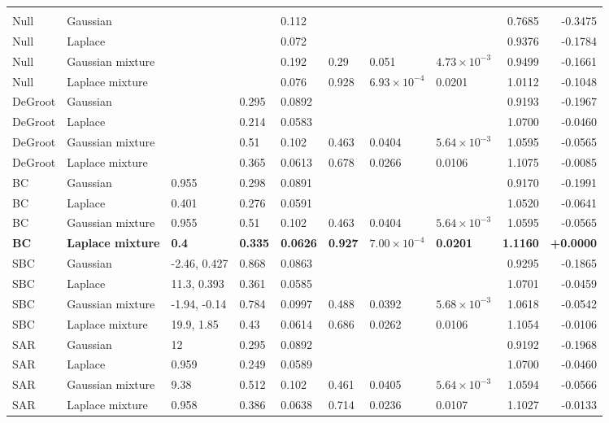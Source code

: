 \begin{longtable}{llllllllrr}
\midrule
\multicolumn{10}{l}{\vkc{}} \\
Null & Gaussian &  &  & 0.112 &  &  &  & 0.7685 & -0.3475 \\
Null & Laplace &  &  & 0.072 &  &  &  & 0.9376 & -0.1784 \\
Null & Gaussian mixture &  &  & 0.192 & 0.29 & 0.051 & $4.73\times10^{-3}$ & 0.9499 & -0.1661 \\
Null & Laplace mixture &  &  & 0.076 & 0.928 & $6.93\times10^{-4}$ & 0.0201 & 1.0112 & -0.1048 \\
DeGroot & Gaussian &  & 0.295 & 0.0892 &  &  &  & 0.9193 & -0.1967 \\
DeGroot & Laplace &  & 0.214 & 0.0583 &  &  &  & 1.0700 & -0.0460 \\
DeGroot & Gaussian mixture &  & 0.51 & 0.102 & 0.463 & 0.0404 & $5.64\times10^{-3}$ & 1.0595 & -0.0565 \\
DeGroot & Laplace mixture &  & 0.365 & 0.0613 & 0.678 & 0.0266 & 0.0106 & 1.1075 & -0.0085 \\
BC & Gaussian & 0.955 & 0.298 & 0.0891 &  &  &  & 0.9170 & -0.1991 \\
BC & Laplace & 0.401 & 0.276 & 0.0591 &  &  &  & 1.0520 & -0.0641 \\
BC & Gaussian mixture & 0.955 & 0.51 & 0.102 & 0.463 & 0.0404 & $5.64\times10^{-3}$ & 1.0595 & -0.0565 \\
\textbf{BC} & \textbf{Laplace mixture} & \textbf{0.4} & \textbf{0.335} & \textbf{0.0626} & \textbf{0.927} & \textbf{$7.00\times10^{-4}$} & \textbf{0.0201} & \textbf{1.1160} & \textbf{+0.0000} \\
SBC & Gaussian & -2.46, 0.427 & 0.868 & 0.0863 &  &  &  & 0.9295 & -0.1865 \\
SBC & Laplace & 11.3, 0.393 & 0.361 & 0.0585 &  &  &  & 1.0701 & -0.0459 \\
SBC & Gaussian mixture & -1.94, -0.14 & 0.784 & 0.0997 & 0.488 & 0.0392 & $5.68\times10^{-3}$ & 1.0618 & -0.0542 \\
SBC & Laplace mixture & 19.9, 1.85 & 0.43 & 0.0614 & 0.686 & 0.0262 & 0.0106 & 1.1054 & -0.0106 \\
SAR & Gaussian & 12 & 0.295 & 0.0892 &  &  &  & 0.9192 & -0.1968 \\
SAR & Laplace & 0.959 & 0.249 & 0.0589 &  &  &  & 1.0700 & -0.0460 \\
SAR & Gaussian mixture & 9.38 & 0.512 & 0.102 & 0.461 & 0.0405 & $5.64\times10^{-3}$ & 1.0594 & -0.0566 \\
SAR & Laplace mixture & 0.958 & 0.386 & 0.0638 & 0.714 & 0.0236 & 0.0107 & 1.1027 & -0.0133 \\

\end{longtable}
